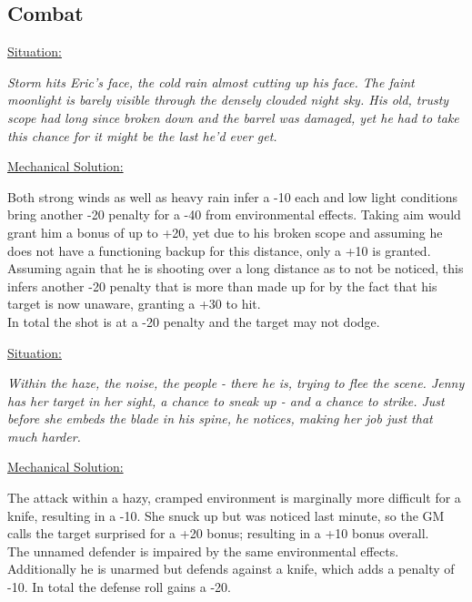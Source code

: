 \documentclass[12pt,a4paper,openany]{book}
\begin{document}
	\subsection*{Combat}
	\ul{Situation:}
	\begin{exampleblock}
		\textit{Storm hits Eric’s face, the cold rain almost cutting up his face. The faint moonlight is barely visible through the densely clouded night sky. His old, trusty scope had long since broken down and the barrel was damaged, yet he had to take this chance for it might be the last he’d ever get.}
	\end{exampleblock}
	\ul{Mechanical Solution:}
	\begin{exampleblock}
		Both strong winds as well as heavy rain infer a -10 each and low light conditions bring another -20 penalty for a -40 from environmental effects. Taking aim would grant him a bonus of up to +20, yet due to his broken scope and assuming he does not have a functioning backup for this distance, only a +10 is granted. Assuming again that he is shooting over a long distance as to not be noticed, this infers another -20 penalty that is more than made up for by the fact that his target is now unaware, granting a +30 to hit.\\
		In total the shot is at a -20 penalty and the target may not dodge.
	\end{exampleblock}
	\breakline
	\ul{Situation:}
	\begin{exampleblock}
		\textit{Within the haze, the noise, the people - there he is, trying to flee the scene. Jenny has her target in her sight, a chance to sneak up - and a chance to strike. Just before she embeds the blade in his spine, he notices, making her job just that much harder.}
	\end{exampleblock}
	\ul{Mechanical Solution:}
	\begin{exampleblock}
		The attack within a hazy, cramped environment is marginally more difficult for a knife, resulting in a -10. She snuck up but was noticed last minute, so the GM calls the target surprised for a +20 bonus; resulting in a +10 bonus overall.\\
		The unnamed defender is impaired by the same environmental effects. Additionally he is unarmed but defends against a knife, which adds a penalty of -10. In total the defense roll gains a -20.
	\end{exampleblock}
\end{document}
